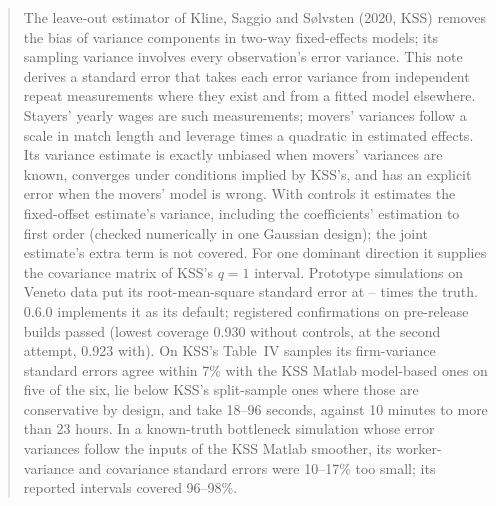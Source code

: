 \begin{abstract}
\noindent The leave-out estimator of Kline, Saggio and S{\o}lvsten (2020, KSS) removes the bias of variance
components in two-way fixed-effects models; its sampling variance involves every observation's error variance.
This note derives a standard error that takes each error variance from independent repeat measurements where they
exist and from a fitted model elsewhere. Stayers' yearly wages are such measurements; movers' variances follow a
scale in match length and leverage times a quadratic in estimated effects. Its variance estimate is exactly
unbiased when movers' variances are known, converges under conditions implied by KSS's, and has an explicit error
when the movers' model is wrong. With controls it estimates the fixed-offset estimate's variance, including the
coefficients' estimation to first order (checked numerically in one Gaussian design); the joint estimate's
extra term is not covered. For one dominant direction it supplies the covariance matrix of KSS's $q=1$ interval.
Prototype simulations on Veneto data put its root-mean-square standard error at --
times the truth. \fevc{} 0.6.0 implements it as its default; registered confirmations on pre-release builds
passed (lowest coverage 0.930 without controls, at the second attempt, 0.923 with). On KSS's Table~IV samples
its firm-variance standard errors agree within 7\% with the KSS Matlab model-based ones on five of the six, lie
below KSS's split-sample ones where those are conservative by design, and take 18--96 seconds, against 10
minutes to more than 23 hours. In a known-truth bottleneck simulation whose error variances follow the inputs of
the KSS Matlab smoother, its worker-variance and covariance standard errors were 10--17\% too small; its reported
intervals covered 96--98\%.
\end{abstract}
